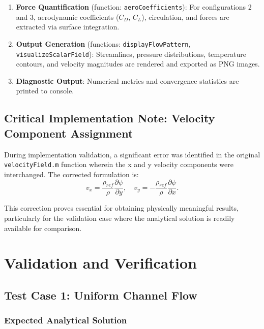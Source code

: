\begin{enumerate}
    \item \textbf{Force Quantification} (function: \texttt{aeroCoefficients}): For configurations 2 and 3, aerodynamic coefficients ($C_D$, $C_L$), circulation, and forces are extracted via surface integration.

    \item \textbf{Output Generation} (functions: \texttt{displayFlowPattern}, \texttt{visualizeScalarField}): Streamlines, pressure distributions, temperature contours, and velocity magnitudes are rendered and exported as PNG images.
    
    \item \textbf{Diagnostic Output}: Numerical metrics and convergence statistics are printed to console.
    
\end{enumerate}

\subsection{Critical Implementation Note: Velocity Component Assignment}

During implementation validation, a significant error was identified in the original \texttt{velocityField.m} function wherein the x and y velocity components were interchanged. The corrected formulation is:
\begin{equation}
v_x = \frac{\rho_{ref}}{\rho} \frac{\partial \psi}{\partial y}, \quad v_y = -\frac{\rho_{ref}}{\rho} \frac{\partial \psi}{\partial x}.
\end{equation}

This correction proves essential for obtaining physically meaningful results, particularly for the validation case where the analytical solution is readily available for comparison.

\section{Validation and Verification}

\subsection{Test Case 1: Uniform Channel Flow}

\subsubsection{Expected Analytical Solution}


